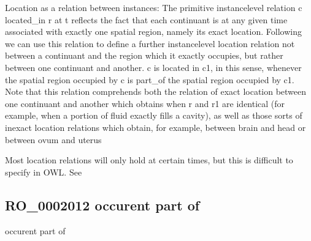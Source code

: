 \documentclass[letterpaper,10pt,english]{sphinxmanual}
\begin{document}
\begin{sphinxShadowBox}

\sphinxAtStartPar
Location as a relation between instances: The primitive instance\sphinxhyphen{}level relation c located\_in r at t reflects the fact that each continuant is at any given time associated with exactly one spatial region, namely its exact location. Following we can use this relation to define a further instance\sphinxhyphen{}level location relation \sphinxhyphen{} not between a continuant and the region which it exactly occupies, but rather between one continuant and another. c is located in c1, in this sense, whenever the spatial region occupied by c is part\_of the spatial region occupied by c1.    Note that this relation comprehends both the relation of exact location between one continuant and another which obtains when r and r1 are identical (for example, when a portion of fluid exactly fills a cavity), as well as those sorts of inexact location relations which obtain, for example, between brain and head or between ovum and uterus

\sphinxAtStartPar
Most location relations will only hold at certain times, but this is difficult to specify in OWL. See 
\end{sphinxShadowBox}

\begin{sphinxShadowBox}

\sphinxAtStartPar
{}
\end{sphinxShadowBox}
\begin{quote}

\ignorespaces \end{quote}


\subsection{RO\_0002012 \sphinxhyphen{} occurent part of}
\label{\detokenize{doc-RO_0002012:ro-0002012-occurent-part-of}}\label{\detokenize{doc-RO_0002012:index-0}}\label{\detokenize{doc-RO_0002012::doc}}
\begin{sphinxShadowBox}

\sphinxAtStartPar
occurent part of
\end{sphinxShadowBox}
\end{document}
